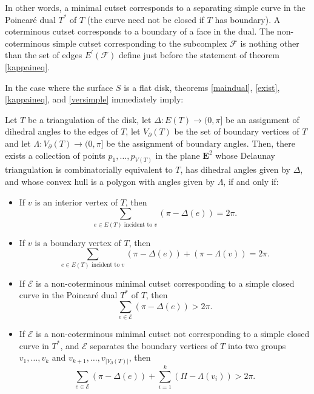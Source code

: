 \documentclass{acmart}
\newcommand{\thm}[2]{\begin{#1} #2 \end{#1}}
\begin{document}
In other words, a minimal cutset corresponds to a separating simple
curve in the Poincar\'e dual $T^*$ of $T$ (the curve need not be closed if $T$
has boundary). A coterminous cutset corresponds to a boundary of a
face in the dual. The non-coterminous simple cutset corresponding to
the subcomplex $\mathcal{F}$ is nothing other than the set of edges
$E^\prime(\mathcal{F})$ define just before the statement of theorem
\ref{kappaineq}. 

In the case where the surface $S$ is a flat disk, theorems
\ref{maindual}, \ref{exist}, \ref{kappaineq}, and \ref{versimple}
immediately imply:

\thm{theorem}
{
\label{andreevthm}
Let $T$ be a triangulation of the disk, let $\Delta: E(T) \rightarrow
(0, \pi]$ be an assignment of dihedral angles to the edges of $T$, let
$V_\partial(T)$ be the set of boundary vertices of $T$ and
let $\Lambda: V_\partial(T) \rightarrow (0, \pi]$ be the assignment of
boundary angles. Then, there exists a collection of points $p_1,
\ldots, p_{V(T)}$ in the plane $\mathbf{E}^2$ whose Delaunay
triangulation is combinatorially equivalent to $T$, has dihedral
angles given by $\Delta$, and whose convex hull is a polygon with
angles given by $\Lambda$, if and only if:

\begin{itemize}

\item\label{sumvv} If $v$ is an interior vertex of $T$, then
\begin{equation}
\sum_{\mbox{$e \in E(T)$ incident to $v$}} (\pi - \Delta(e)) = 2\pi.
\end{equation}

\item\label{sumvb} If $v$ is a boundary vertex of $T$, then
\begin{equation}
\sum_{\mbox{$e \in E(T)$ incident to $v$}} (\pi - \Delta(e)) + (\pi -
\Lambda(v)) = 2\pi.
\end{equation}

\item\label{sumintcyc} If $\mathcal{E}$ is a non-coterminous minimal cutset
corresponding to a simple closed curve in the Poincar\'e dual $T^*$ of
$T$, then
\begin{equation}
\sum_{e \in \mathcal{E}} (\pi - \Delta(e)) > 2\pi.
\end{equation}

\item\label{sumextcyc} If $\mathcal{E}$ is a non-coterminous minimal
  cutset not corresponding to a simple closed curve in $T^*$, and
  $\mathcal{E}$ separates the boundary vertices of $T$ into two groups
  $v_1, \ldots, v_k$ and $v_{k+1}, \ldots, v_{|V_\partial(T)|}$, then
\begin{equation}
\sum_{e \in \mathcal{E}} (\pi - \Delta(e)) + \sum_{i=1}^k (\Pi-\Lambda(v_i))> 2\pi.
\end{equation}

\end{itemize}
}
\end{document}
